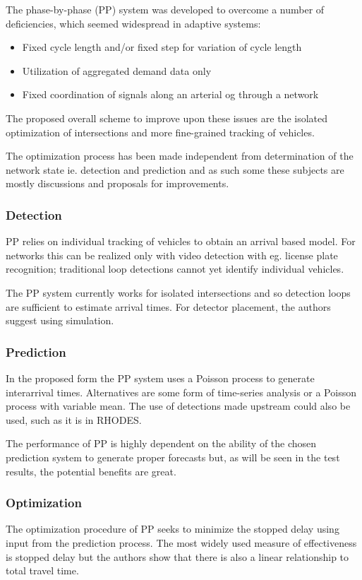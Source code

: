 The phase-by-phase (PP) system was developed to overcome a number of deficiencies, which seemed widespread in adaptive systems:

\begin{itemize}
\item Fixed cycle length and/or fixed step for variation of cycle length
\item Utilization of aggregated demand data only
\item Fixed coordination of signals along an arterial og through a network
\end{itemize}

The proposed overall scheme to improve upon these issues are the isolated optimization of intersections and more fine-grained tracking of vehicles.

The optimization process has been made independent from determination of the network state ie. detection and prediction and as such some these subjects are mostly discussions and proposals for improvements.

\subsubsection*{Detection}
PP relies on individual tracking of vehicles to obtain an arrival based model. For networks this can be realized only with video detection with eg. license plate recognition; traditional loop detections cannot yet identify individual vehicles.

The PP system currently works for isolated intersections and so detection loops are sufficient to estimate arrival times. For detector placement, the authors suggest using simulation.

\subsubsection*{Prediction}
In the proposed form the PP system uses a Poisson process to generate interarrival times.
Alternatives are some form of time-series analysis or a Poisson process with variable mean. The use of detections made upstream could also be used, such as it is in RHODES.

The performance of PP is highly dependent on the ability of the chosen prediction system to generate proper forecasts but, as will be seen in the test results, the potential benefits are great.

\subsubsection*{Optimization}
The optimization procedure of PP seeks to minimize the stopped delay using input from the prediction process. The most widely used measure of effectiveness is stopped delay but the authors show that there is also a linear relationship to total travel time.

